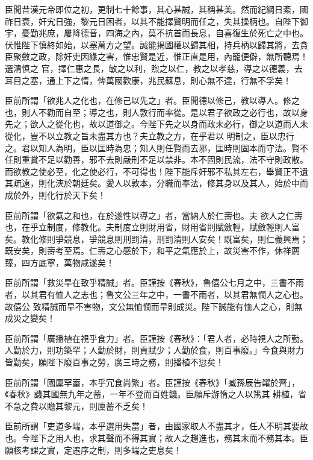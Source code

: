 \begin{pinyinscope}
 臣聞昔漢元帝即位之初，更制七十餘事，其心甚誠，其稱甚美。然而紀綱日紊，國祚日衰，奸宄日強，黎元日困者，以其不能擇賢明而任之，失其操柄也。自陛下御宇，憂勤兆庶，屢降德音，四海之內，莫不抗首而長息，自喜復生於死亡之中也。伏惟陛下慎終如始，以塞萬方之望。誠能揭國權以歸其相，持兵柄以歸其將，去貪臣聚斂之政，除奸吏因緣之害，惟忠賢是近，惟正直是用，內寵便僻，無所聽焉！選清慎之
 官，擇仁惠之長，敏之以利，煦之以仁，教之以孝慈，導之以德義，去耳目之塞，通上下之情，俾萬國歡康，兆民蘇息，則心無不達，行無不孚矣！



 臣前所謂「欲兆人之化也，在修己以先之」者。臣聞德以修己，教以導人。修之也，則人不勸而自至；導之也，則人敦行而率從。是以君子欲政之必行也，故以身先之；欲人之從化也，故以道御之。今陛下先之以身而政未必行，御之以道而人未從化，豈不以立教之旨未盡其方也？夫立教之方，在乎君以
 明制之，臣以忠行之。君以知人為明，臣以匡時為忠；知人則任賢而去邪，匡時則固本而守法。賢不任則重賞不足以勸善，邪不去則嚴刑不足以禁非。本不固則民流，法不守則政散。而欲教之使必至，化之使必行，不可得也！陛下能斥奸邪不私其左右，舉賢正不遺其疏遠，則化浹於朝廷矣。愛人以敦本，分職而奉法，修其身以及其人，始於中而成於外，則化行於天下矣！



 臣前所謂「欲氣之和也，在於遂性以導之」者，當納人於仁壽也。夫
 欲人之仁壽也，在乎立制度，修教化。夫制度立則財用省，財用省則賦斂輕，賦斂輕則人富矣。教化修則爭競息，爭競息則刑罰清，刑罰清則人安矣！既富矣，則仁義興焉；既安矣，則壽考至焉。仁壽之心感於下，和平之氣應於上，故災害不作，休祥薦臻，四方底寧，萬物咸遂矣！



 臣前所謂「救災旱在致乎精誠」者。臣謹按《春秋》，魯僖公七月之中，三書不雨者，以其君有恤人之志也；魯文公三年之中，一書不雨者，以其君無憫人之心也。故僖公
 致精誠而旱不害物，文公無恤憫而旱則成災。陛下誠能有恤人之心，則無成災之變矣！



 臣前所謂「廣播植在視乎食力」者。臣謹按《春秋》：「君人者，必時視人之所勤。人勤於力，則功築罕；人勤於財，則貢賦少；人勤於食，則百事廢。」今食與財力皆勤矣，願陛下廢百事之勞，廣三時之務，則播植不愆矣！



 臣前所謂「國廩罕蓄，本乎冗食尚繁」者。臣謹按《春秋》「臧孫辰告糴於齊」，《春秋》譏其國無九年之蓄，一年不登而百姓饑。臣願斥游惰之人以篤其
 耕植，省不急之費以贍其黎元，則廩蓄不乏矣！



 臣前所謂「吏道多端，本乎選用失當」者，由國家取人不盡其才，任人不明其要故也。今陛下之用人也，求其聲而不得其實；故人之趨進也，務其末而不務其本。臣願核考課之實，定遷序之制，則多端之吏息矣！




\end{pinyinscope}
